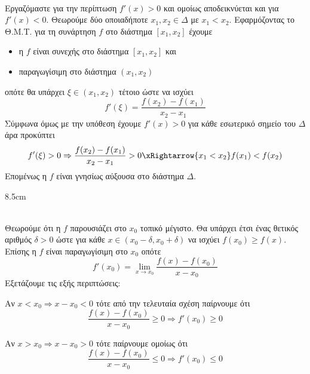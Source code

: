 \textbf{}\\
Εργαζόμαστε για την περίπτωση $ f'(x)>0 $ και ομοίως αποδεικνύεται και για $ f'(x)<0 $. Θεωρούμε δύο οποιαδήποτε $ x_1,x_2\in\varDelta $ με $ x_1<x_2 $. Εφαρμόζοντας το Θ.Μ.Τ. για τη συνάρτηση $ f $ στο διάστημα $ [x_1,x_2] $ έχουμε
\begin{itemize}
\item η $ f $ είναι συνεχής στο διάστημα $ [x_1,x_2] $ και
\item παραγωγίσιμη στο διάστημα $ (x_1,x_2) $
\end{itemize}
οπότε θα υπάρχει $ \xi\in(x_1,x_2) $ τέτοιο ώστε να ισχύει
\[ f'(\xi)=\dfrac{f(x_2)-f(x_1)}{x_2-x_1} \]
Σύμφωνα όμως με την υπόθεση έχουμε $ f'(x)>0 $ για κάθε εσωτερικό σημείο του $ \varDelta $ άρα προκύπτει
\[ f'(\xi)>0\Rightarrow \dfrac{f(x_2)-f(x_1)}{x_2-x_1}>0\xRightarrow{x_1<x_2} f(x_1)<f(x_2) \]
Επομένως η $ f $ είναι γνησίως αύξουσα στο διάστημα $ \varDelta $.
\begin{Thewrhmabox}{8.5cm}
\label{thewrhma:fermat}
\end{Thewrhmabox}
\textbf{}\\
Θεωρούμε ότι η $ f $ παρουσιάζει στο $ x_0 $ τοπικό μέγιστο. Θα υπάρχει έτσι ένας θετικός αριθμός $ \delta>0 $ ώστε για κάθε $ x\in(x_0-\delta,x_0+\delta) $ να ισχύει $ f(x_0)\geq f(x) $. Επίσης η $ f $ είναι παραγωγίσιμη στο $ x_0 $ οπότε
\[ f'(x_0)=\lim_{x\to x_0}{\dfrac{f(x)-f(x_0)}{x-x_0}} \]
Εξετάζουμε τις εξής περιπτώσεις:
\begin{alist}
\item Αν $ x<x_0\Rightarrow x-x_0<0 $ τότε από την τελευταία σχέση παίρνουμε ότι
\begin{equation}\label{f1}
\dfrac{f(x)-f(x_0)}{x-x_0}\geq 0\Rightarrow f'(x_0)\geq 0
\end{equation}
\item Αν $ x>x_0\Rightarrow x-x_0>0 $ τότε παίρνουμε ομοίως ότι
\begin{equation}\label{f2}
\dfrac{f(x)-f(x_0)}{x-x_0}\leq 0\Rightarrow f'(x_0)\leq 0 
\end{equation}
\end{alist}

